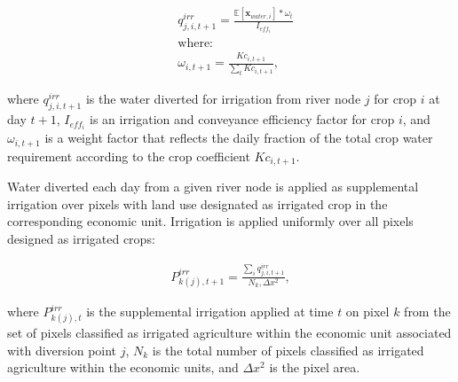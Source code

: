 \begin{align}
    &q^{irr}_{j,i,t+1} = \frac{  \mathbb{E}[\mathbf{x}_{water, i}]*\omega_{t}}{I_{eff_i}}\\
     \nonumber &\text{where: }\\ 
    &\omega_{i,t+1} = \frac{Kc_{i,t+1}}{\sum_t Kc_{i,t+1}},
\end{align}

\noindent where $q^{irr}_{j,i,t+1}$ is the water diverted for irrigation from river node $j$ for crop $i$ at day $t+1$, $I_{eff_i}$ is an irrigation and conveyance efficiency factor for crop $i$, and $\omega_{i,t+1}$ is a weight factor that reflects the daily fraction of the total crop water requirement according to the crop coefficient $Kc_{i,t+1}$.

Water diverted each day from a given river node is applied as supplemental irrigation over pixels with land use designated as irrigated crop in the corresponding economic unit. Irrigation is applied uniformly over all pixels designed as irrigated crops: 

\begin{align}
    P^{irr}_{k(j),t+1} = \frac{\sum_i q^{irr}_{j,i,t+1} }{N_k, \Delta x^2},
\end{align}

\noindent where $P^{irr}_{k(j),t}$ is the supplemental irrigation applied at time $t$ on pixel $k$ from the set of pixels classified as irrigated agriculture within the economic unit associated with diversion point $j$, $N_k$ is the total number of pixels classified as irrigated agriculture within the economic units, and $\Delta x^2$ is the pixel area. 
